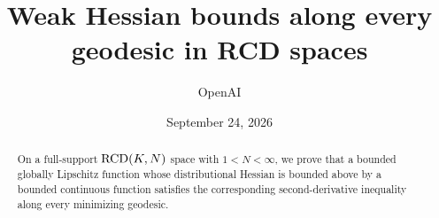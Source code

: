 \documentclass[11pt]{article}
\title{Weak Hessian bounds along every geodesic in RCD spaces}
\author{OpenAI}
\date{September 24, 2026}
\begin{document}
\maketitle
\begin{abstract}
On a full-support \(\mathrm{RCD}(K,N)\) space with \(1<N<\infty\), we prove
that a bounded globally Lipschitz function whose distributional
Hessian is bounded above by a bounded continuous function satisfies
the corresponding second-derivative inequality along every
minimizing geodesic.
\end{abstract}
\tableofcontents







\end{document}
